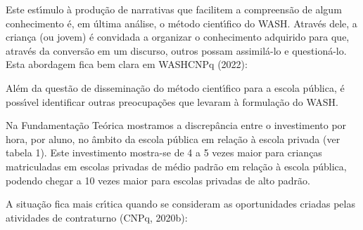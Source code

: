 \documentclass[
12pt,		%
openright,	%
twoside,  %
a4paper,			%
chapter=TITLE,		%
english,			%
french,				%
spanish,			%
brazil				%
]{USPSC-classe/USPSC}
\begin{document}
Este est\'{\i}mulo \`a produ\c{c}\~ao de narrativas que facilitem a compreens\~ao de algum conhecimento \'e, em \'ultima an\'alise, o m\'etodo cient\'{\i}fico do WASH. Atrav\'es dele, a crian\c{c}a (ou jovem) \'e convidada a organizar o conhecimento adquirido para que, atrav\'es da convers\~ao em um discurso, outros possam assimil\'a-lo e question\'a-lo. Esta abordagem fica bem clara em  WASHCNPq (2022):









\noindent\begin{center}\mbox{\centering{}}\end{center}


Al\'em da quest\~ao de dissemina\c{c}\~ao do m\'etodo cient\'{\i}fico para a escola p\'ublica, \'e poss\'{\i}vel identificar outras preocupa\c{c}\~oes que levaram \`a formula\c{c}\~ao do WASH.








Na Fundamenta\c{c}\~ao Te\'orica mostramos a discrep\^ancia entre o investimento por hora, por aluno, no \^ambito da escola p\'ublica em rela\c{c}\~ao \`a escola privada (ver tabela 1). Este investimento mostra-se de 4 a 5 vezes maior para crian\c{c}as matriculadas em escolas privadas de m\'edio padr\~ao em rela\c{c}\~ao \`a escola p\'ublica, podendo chegar a 10 vezes maior para escolas privadas de alto padr\~ao.








A situa\c{c}\~ao fica mais cr\'{\i}tica quando se consideram as oportunidades criadas pelas atividades de contraturno  (CNPq, 2020b):
\end{document}
